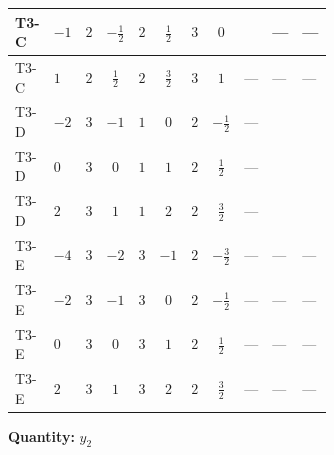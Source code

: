 \documentclass[8pt]{article}
\begin{document}
\begin{landscape}
\begin{longtable}{@{}llcccccc >{\raggedright\arraybackslash}p{0.21\linewidth} >{\raggedright\arraybackslash}p{0.21\linewidth} >{\raggedright\arraybackslash}p{0.21\linewidth}@{}}
\midrule
T3-C & $-1$ & $2$ & $-\frac{1}{2}$ & $2$ & $\frac{1}{2}$ & $3$ & $0$ & \scriptsize\adjustbox{max width=\linewidth}{$\begin{gathered} +\frac{1}{4} (3 \left({y_1}\,\left({y_1}\right)^{\dagger}\,{y_2}\right)_{ij}+2 \left({y_2}\,\left({y_1}\right)^{\dagger}\,{y_1}\right)_{ij}+2 \left({Y_e}\,\left({Y_e}\right)^{\dagger}\,{y_2}\right)_{ij}+5 \left({y_2}\,\left({y_2}\right)^{\dagger}\,{y_2}\right)_{ij})\end{gathered}$} & --- & --- \\
\midrule
T3-C & $1$ & $2$ & $\frac{1}{2}$ & $2$ & $\frac{3}{2}$ & $3$ & $1$ & --- & --- & --- \\
\midrule
T3-D & $-2$ & $3$ & $-1$ & $1$ & $0$ & $2$ & $-\frac{1}{2}$ & --- & \scriptsize\adjustbox{max width=\linewidth}{$\begin{gathered} 2 T_{\nu}^{(2)} \left({y_2}\right)_{ij}\end{gathered}$} & \scriptsize\adjustbox{max width=\linewidth}{$\begin{gathered} +\frac{3}{4} \left({y_1}\,\left({y_1}\right)^{\dagger}\,{y_2}\right)_{ij}\end{gathered}$} \\
\midrule
T3-D & $0$ & $3$ & $0$ & $1$ & $1$ & $2$ & $\frac{1}{2}$ & --- & \scriptsize\adjustbox{max width=\linewidth}{$\begin{gathered} 2 T_{\nu}^{(2)} \left({y_2}\right)_{ij}\end{gathered}$} & \scriptsize\adjustbox{max width=\linewidth}{$\begin{gathered} +\frac{3}{4} \left({y_1}\,\left({y_1}\right)^{\dagger}\,{y_2}\right)_{ij}\end{gathered}$} \\
\midrule
T3-D & $2$ & $3$ & $1$ & $1$ & $2$ & $2$ & $\frac{3}{2}$ & --- & \scriptsize\adjustbox{max width=\linewidth}{$\begin{gathered} 2 T_{\nu}^{(2)} \left({y_2}\right)_{ij}\end{gathered}$} & \scriptsize\adjustbox{max width=\linewidth}{$\begin{gathered} +\frac{3}{4} \left({y_1}\,\left({y_1}\right)^{\dagger}\,{y_2}\right)_{ij}\end{gathered}$} \\
\midrule
T3-E & $-4$ & $3$ & $-2$ & $3$ & $-1$ & $2$ & $-\frac{3}{2}$ & --- & --- & --- \\
\midrule
T3-E & $-2$ & $3$ & $-1$ & $3$ & $0$ & $2$ & $-\frac{1}{2}$ & --- & --- & --- \\
\midrule
T3-E & $0$ & $3$ & $0$ & $3$ & $1$ & $2$ & $\frac{1}{2}$ & --- & --- & --- \\
\midrule
T3-E & $2$ & $3$ & $1$ & $3$ & $2$ & $2$ & $\frac{3}{2}$ & --- & --- & --- \\
\midrule
\bottomrule
\end{longtable}
\clearpage
\noindent\textbf{Quantity: }$y_2$\par\smallskip

\end{landscape}
\end{document}

